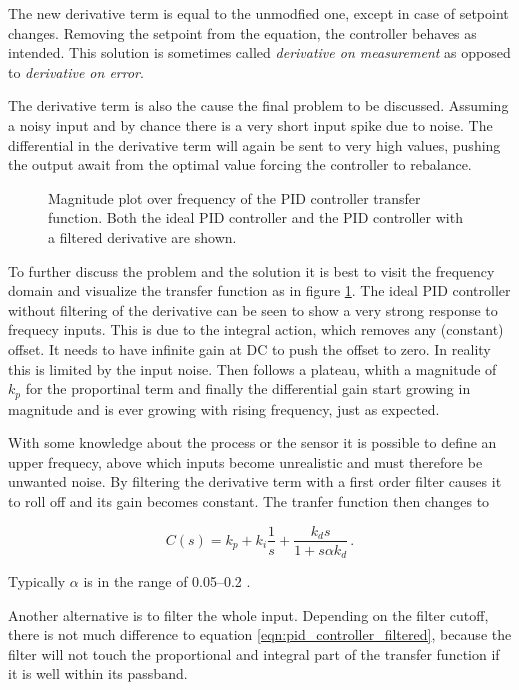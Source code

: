 The new derivative term is equal to the unmodfied one, except in case of setpoint changes. Removing the setpoint from the equation, the controller behaves as intended. This solution is sometimes called \textit{derivative on measurement} as opposed to \textit{derivative on error}.

The derivative term is also the cause the final problem to be discussed. Assuming a noisy input and by chance there is a very short input spike due to noise. The differential in the derivative term will again be sent to very high values, pushing the output await from the optimal value forcing the controller to rebalance.
\begin{figure}[hb]
    \centering
    
    \caption{Magnitude plot over frequency of the PID controller transfer function. Both the ideal PID controller and the PID controller with a filtered derivative are shown.}
    \label{fig:sim_pid_controller}
\end{figure}

To further discuss the problem and the solution it is best to visit the frequency domain and visualize the transfer function as in figure \ref{fig:sim_pid_controller}. The ideal PID controller without filtering of the derivative can be seen to show a very strong response to frequecy inputs. This is due to the integral action, which removes any (constant) offset. It needs to have infinite gain at DC to push the offset to zero. In reality this is limited by the input noise. Then follows a plateau, whith a magnitude of $k_p$ for the proportinal term and finally the differential gain start growing in magnitude and is ever growing with rising frequency, just as expected.

With some knowledge about the process or the sensor it is possible to define an upper frequecy, above which inputs become unrealistic and must therefore be unwanted noise. By filtering the derivative term with a first order filter causes it to roll off and its gain becomes constant. The tranfer function then changes to

\begin{equation}
    C(s) = k_p + k_i \frac{1}{s} + \frac{k_d s}{1 + s \alpha k_d} \,. \label{eqn:pid_controller_filtered}
\end{equation}

Typically $\alpha$ is in the range of \numrange{0.05}{0.2} \citep[p. 129]{pid_controller}.

Another alternative is to filter the whole input. Depending on the filter cutoff, there is not much difference to equation \ref{eqn:pid_controller_filtered}, because the filter will not touch the proportional and integral part of the transfer function if it is well within its passband.

